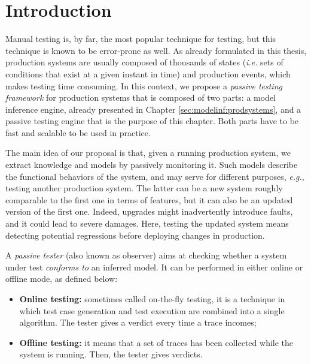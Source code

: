 \section{Introduction}
\label{sec:testing:intro}

Manual testing is, by far, the most popular technique for
testing, but this technique is known to be error-prone as well.
As already formulated in this thesis, production systems are
usually composed of thousands of states (\emph{i.e.} sets of
conditions that exist at a given instant in time) and production
events, which makes testing time consuming.  In this context, we
propose a \emph{passive testing framework} for production systems
that is composed of two parts: a model inference engine, already
presented in Chapter \ref{sec:modelinf:prodsystems}, and a
passive testing engine that is the purpose of this chapter. Both
parts have to be fast and scalable to be used in practice.

The main idea of our proposal is that, given a running production
system, we extract knowledge and models by passively monitoring
it. Such models describe the functional behaviors of the system,
and may serve for different purposes, \emph{e.g.}, testing
another production system. The latter can be a new system roughly
comparable to the first one in terms of features, but it can also
be an updated version of the first one. Indeed, upgrades might
inadvertently introduce faults, and it could lead to severe
damages. Here, testing the updated system means detecting
potential regressions before deploying changes in production.

A \textit{passive tester} (also known as observer) aims at
checking whether a system under test \emph{conforms to} an
inferred model. It can be performed in either online or offline
mode, as defined below:

\begin{itemize}
    \item \textbf{Online testing:} sometimes called on-the-fly
        testing, it is a technique in which test case generation
        and test execution are combined into a single algorithm.
        The tester gives a verdict every time a trace incomes;

    \item \textbf{Offline testing:} it means that a set of traces
        has been collected while the system is running. Then, the
        tester gives verdicts.
\end{itemize}

